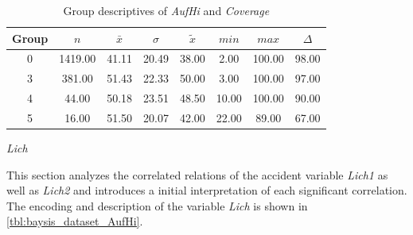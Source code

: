 \begin{table}[ht]
	\tiny
	\centering
    \begin{tabular}{c|c|c|c|c|c|c|c}
        \toprule
        Group & $n$ & $\bar{x}$ & $\sigma$ & $\tilde{x}$ & $min$ & $max$ & $\Delta$ \\ 
        \midrule
        0 & 1419.00 & 41.11 & 20.49 & 38.00 & 2.00 & 100.00 & 98.00 \\ 
        3 & 381.00 & 51.43 & 22.33 & 50.00 & 3.00 & 100.00 & 97.00 \\ 
        4 & 44.00 & 50.18 & 23.51 & 48.50 & 10.00 & 100.00 & 90.00 \\ 
        5 & 16.00 & 51.50 & 20.07 & 42.00 & 22.00 & 89.00 & 67.00 \\ 
        \bottomrule
      \end{tabular}
	\caption{Group descriptives of \textit{AufHi} and \textit{Coverage}}
	\label{tbl:descriptives_baysis_matched_AufHi_Cov}
\end{table}

\Large
\centerline{\textit{Lich}}
\normalsize
This section analyzes the correlated relations of the accident variable \textit{Lich1} as well as \textit{Lich2} and introduces a initial interpretation of each significant correlation. The encoding and description of the variable \textit{Lich} is shown in \cref{tbl:baysis_dataset_AufHi}.

